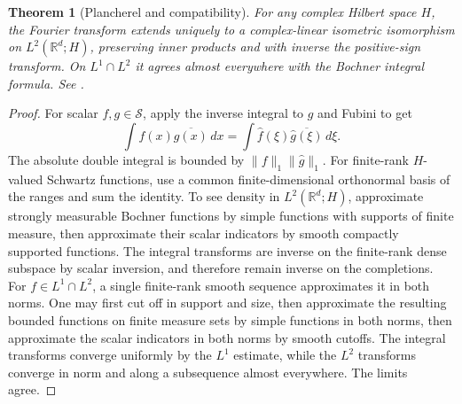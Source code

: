\documentclass[11pt,oneside,openany]{book}
\newtheorem{theorem}{Theorem}[chapter]
\theoremstyle{definition}
\theoremstyle{remark}
\begin{document}
\begin{theorem}[Plancherel and compatibility]
\label{p102:AN-06-C01-R02}
For any complex Hilbert space \(H\), the Fourier transform extends uniquely to a complex-linear isometric isomorphism on \(L^2(\mathbb R^d;H)\), preserving inner products and with inverse the positive-sign transform. On \(L^1\cap L^2\) it agrees almost everywhere with the Bochner integral formula. See \cite[\S2.2.4]{grafakos}.
\end{theorem}
\begin{proof}
For scalar \(f,g\in\mathcal S\), apply the inverse integral to \(g\) and Fubini to get
\[
 \int f(x)\overline{g(x)}\,dx
 =\int \widehat f(\xi)\overline{\widehat g(\xi)}\,d\xi .
\]
The absolute double integral is bounded by \(\|f\|_1\|\widehat g\|_1\). For finite-rank \(H\)-valued Schwartz functions, use a common finite-dimensional orthonormal basis of the ranges and sum the identity. To see density in \(L^2(\mathbb R^d;H)\), approximate strongly measurable Bochner functions by simple functions with supports of finite measure, then approximate their scalar indicators by smooth compactly supported functions. The integral transforms are inverse on the finite-rank dense subspace by scalar inversion, and therefore remain inverse on the completions. For \(f\in L^1\cap L^2\), a single finite-rank smooth sequence approximates it in both norms. One may first cut off in support and size, then approximate the resulting bounded functions on finite measure sets by simple functions in both norms, then approximate the scalar indicators in both norms by smooth cutoffs. The integral transforms converge uniformly by the \(L^1\) estimate, while the \(L^2\) transforms converge in norm and along a subsequence almost everywhere. The limits agree.
\end{proof}
\end{document}
